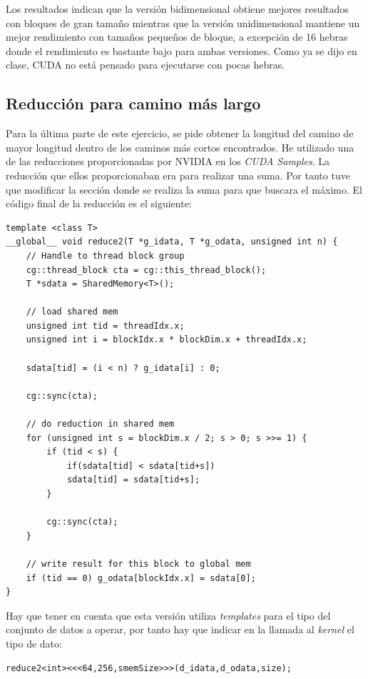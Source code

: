 Los resultados indican que la versión bidimensional obtiene mejores resultados con bloques de gran tamaño mientras que la versión unidimensional mantiene un mejor rendimiento con tamaños pequeños de bloque, a excepción de 16 hebras donde el rendimiento es bastante bajo para ambas versiones. Como ya se dijo en clase, CUDA no está pensado para ejecutarse con pocas hebras.

\subsection{Reducción para camino más largo}
Para la última parte de este ejercicio, se pide obtener la longitud del camino de mayor longitud dentro de los caminos más cortos encontrados. He utilizado una de las reducciones proporcionadas por NVIDIA en los \textit{CUDA Samples}. La reducción que ellos proporcionaban era para realizar una suma. Por tanto tuve que modificar la sección donde se realiza la suma para que buscara el máximo. El código final de la reducción es el siguiente:

\begin{verbatim}
template <class T>
__global__ void reduce2(T *g_idata, T *g_odata, unsigned int n) {
	// Handle to thread block group
	cg::thread_block cta = cg::this_thread_block();
	T *sdata = SharedMemory<T>();
	
	// load shared mem
	unsigned int tid = threadIdx.x;
	unsigned int i = blockIdx.x * blockDim.x + threadIdx.x;
	
	sdata[tid] = (i < n) ? g_idata[i] : 0;
	
	cg::sync(cta);
	
	// do reduction in shared mem
	for (unsigned int s = blockDim.x / 2; s > 0; s >>= 1) {
		if (tid < s) {
			if(sdata[tid] < sdata[tid+s])
			sdata[tid] = sdata[tid+s];
		}
		
		cg::sync(cta);
	}
	
	// write result for this block to global mem
	if (tid == 0) g_odata[blockIdx.x] = sdata[0];
}
\end{verbatim}

Hay que tener en cuenta que esta versión utiliza \textit{templates} para el tipo del conjunto de datos a operar, por tanto hay que indicar en la llamada al \textit{kernel} el tipo de dato:

\begin{verbatim}
reduce2<int><<<64,256,smemSize>>>(d_idata,d_odata,size);
\end{verbatim}

